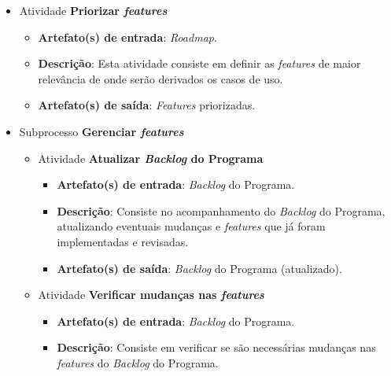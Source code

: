 \begin{itemize}
\begin{itemize}
	  \end{itemize}
	  
     \item Atividade \textbf{Priorizar \textit{features}}
      
	  \begin{itemize}
	    \item \textbf{Artefato(s) de entrada}: \textit{Roadmap}.
	    
	    \item \textbf{Descrição}: Esta atividade consiste em definir as \textit{features} de maior relevância
	      de onde serão derivados os casos de uso.
	    
	    \item \textbf{Artefato(s) de saída}: \textit{Features} priorizadas.
		  
	  \end{itemize}
	
     \item Subprocesso \textbf{Gerenciar \textit{features}}
     
	\begin{itemize}
	 
	 \item Atividade \textbf{Atualizar \textit{Backlog} do Programa}
	    
	    \begin{itemize}
	      \item \textbf{Artefato(s) de entrada}: \textit{Backlog} do Programa.

	      \item \textbf{Descrição}: Consiste no acompanhamento do \textit{Backlog} do Programa, atualizando
		eventuais mudanças e \textit{features} que já foram implementadas e revisadas.
	      
	      \item \textbf{Artefato(s) de saída}: \textit{Backlog} do Programa (atualizado).
		    
	    \end{itemize}
	    
	 \item Atividade \textbf{Verificar mudanças nas \textit{features}}
	    
	    \begin{itemize}
	      \item \textbf{Artefato(s) de entrada}: \textit{Backlog} do Programa.

	      \item \textbf{Descrição}: Consiste em verificar se são necessárias mudanças nas \textit{features} do
		\textit{Backlog} do Programa.
	      

\end{itemize}
\end{itemize}
\end{itemize}
